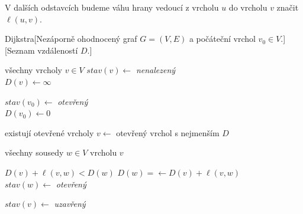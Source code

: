 V dalších odstavcích budeme váhu hrany vedoucí z vrcholu $u$ do vrcholu $v$ značit $\ell(u,v)$.
\begin{pseudo}{Dijkstra}[Nezáporně ohodnocený graf $G=(V,E)$ a počáteční vrchol $v_0\in V$.][Seznam vzdáleností $D$.]
    \begin{For}{všechny vrcholy $v\in V$}
        $stav(v)\gets$ \textit{nenalezený}\\
        $D(v)\gets\infty$\\
    \end{For}
    $stav(v_0)\gets$ \textit{otevřený}\\
    $D(v_0)\gets 0$\\
    \begin{While}{existují otevřené vrcholy}
        $v\gets$ otevřený vrchol s nejmenším $D$\\

        \begin{For}{všechny sousedy $w\in V$ vrcholu $v$}
            \begin{If}{$D(v)+\ell(v,w)<D(w)$}
                $D(w)=\gets D(v)+\ell(v,w)$\\
                $stav(w)\gets$ \textit{otevřený}
            \end{If}
        \end{For}
        $stav(v)\gets$ \textit{uzavřený}
    \end{While}
\end{pseudo}
